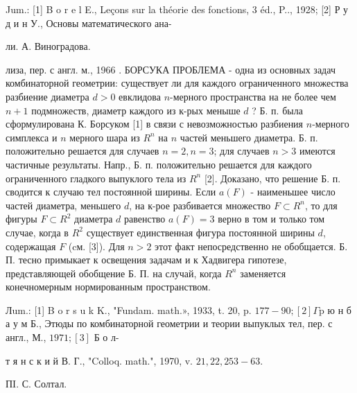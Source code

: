 \documentclass[10pt]{article}
\begin{document}
Jum.: [1] B o r e l E., Leçons sur la théorie des fonctions, 3 éd., P.., 1928; [2] Р у д и н У., Основы математического ана-

ли. А. Виноградова.

лиза, пер. с англ. м., 1966 . БОРСУКА ПРОБЛЕМА - одна из основных задач комбинаторной геометрии: существует ли для каждого ограниченного множества разбиение диаметра $d>0$ евклидова $n$-мерного пространства на не более чем $n+1$ подмножеств, диаметр каждого из к-рых меныше $d$ ? Б. п. была сформулирована К. Борсуком [1] в связи с невозможностью разбиения $n$-мерного симплекса и $n$ мерного шара из $R^{n}$ на $n$ частей меньшего диаметра. Б. п. положительно решается для случаев $n=2, n=3$; для случаев $n>3$ имеются частичные результаты. Напр., Б. п. положительно решается для каждого ограниченного гладкого выпуклого тела из $R^{n}$ [2]. Доказано, что решение Б. п. сводится к случаю тел постоянной ширины. Если $a(F)$ - наименьшее число частей диаметра, меньшего $d$, на к-рое разбивается множество $F \subset R^{n}$, то для фигуры $F \subset R^{2}$ диаметра $d$ равенство $a(F)=3$ верно в том и только том случае, когда в $R^{2}$ существует единственная фигура постоянной ширины $d$, содержащая $F$ (cм. [3]). Для $n>2$ этот факт непосредственно не обобщается. Б. П. тесно примыкает к освещения задачам и к Хадвигера гипотезе, представляющей обобщение Б. П. на случай, когда $R^{n}$ заменяется конечномерным нормированным пространством.



Лum.: [1] B o r s u k K., "Fundam. math.», 1933, t. 20, p. $177-90 ;[2] \Gamma \mathrm{p}$ ю н б а у м Б., Этюды по комбинаторной геометрии и теории выпуклых тел, пер. с англ., М., $1971 ;[3]$ Б о л-

т я н с к и й В. Г., "Colloq. math.", 1970, v. $21,22,253-63$.

ПI. С. Солтал.
\end{document}

